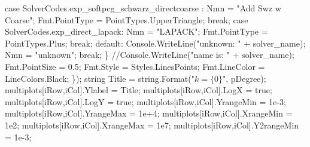 {\btab \btab    case SolverCodes.exp\_softpcg\_schwarz\_directcoarse : \newline 
\btab \btab \btab    Nmn           = "Add Swz w Coarse";\newline 
\btab \btab \btab    Fmt.PointType = PointTypes.UpperTriangle;\newline 
\btab \btab \btab    break;\newline 
\btab \btab    case SolverCodes.exp\_direct\_lapack: \newline 
\btab \btab \btab    Nmn           = "LAPACK"; \newline 
\btab \btab \btab    Fmt.PointType = PointTypes.Plus;\newline 
\btab \btab \btab    break;\newline 
\btab \btab    default:\newline 
\btab \btab \btab    Console.WriteLine("unknown: " + solver\_name); \newline 
\btab \btab \btab    Nmn = "unknown"; \newline 
\btab \btab \btab    break;\newline 
\btab \btab    \} \newline 
\btab \btab    //Console.WriteLine("name is: " + solver\_name); \newline 
\btab \btab    Fmt.PointSize = 0.5;\newline 
\btab \btab    Fmt.Style     = Styles.LinesPoints;\newline 
\btab \btab    Fmt.LineColor = LineColors.Black;\newline 
\btab    \});\newline 
 \newline 
\btab string Title = string.Format("$k = \{0\}$", pDegree);\newline 
\btab multiplots[iRow,iCol].Ylabel = Title;\newline 
\btab multiplots[iRow,iCol].LogX = true;\newline 
\btab multiplots[iRow,iCol].LogY = true;\newline 
 \newline 
\btab multiplots[iRow,iCol].YrangeMin = 1e-3;\newline 
\btab multiplots[iRow,iCol].YrangeMax = 1e+4;\newline 
\btab multiplots[iRow,iCol].XrangeMin = 1e2;\newline 
\btab multiplots[iRow,iCol].XrangeMax = 1e7;\newline 
\btab multiplots[iRow,iCol].Y2rangeMin = 1e-3;\newline 
}
